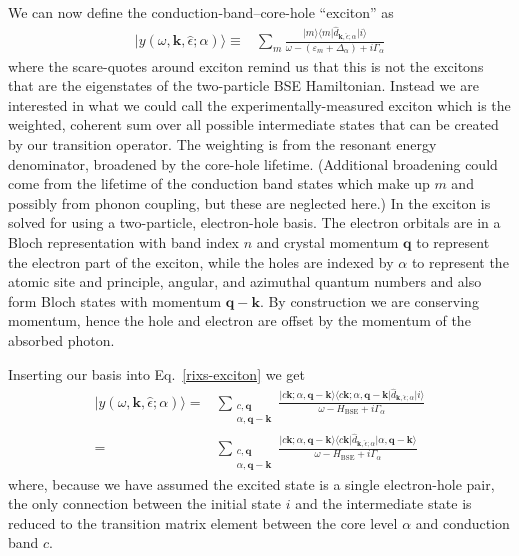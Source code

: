 \documentclass[11pt]{report}
\begin{document}
We can now define the conduction-band--core-hole ``exciton'' as
\begin{align}
\label{rixs-exciton}
\vert y(\omega,\mathbf{k}, \hat{\epsilon};\alpha) \rangle \equiv& \sum_m \frac{ \vert m \rangle \langle m \vert \hat{d}_{\mathbf{k}, \hat{\epsilon};\alpha} \vert i \rangle}{\omega - (\varepsilon_m +\Delta_\alpha) + i\Gamma_{\alpha}} 
\end{align}
where the scare-quotes around exciton remind us that this is not the excitons that are the eigenstates of the two-particle BSE Hamiltonian.
Instead we are interested in what we could call the experimentally-measured exciton which is the weighted, coherent sum over all possible intermediate states that can be created by our transition operator. 
The weighting is from the resonant energy denominator, broadened by the core-hole lifetime. 
(Additional broadening could come from the lifetime of the conduction band states which make up $m$ and possibly from phonon coupling, but these are neglected here.)
In  the exciton is solved for using a two-particle, electron-hole basis. The electron orbitals are in a Bloch representation with band index $n$ and crystal momentum $\mathbf{q}$ to represent the electron part of the exciton, while the holes are indexed by $\alpha$ to represent the atomic site and principle, angular, and azimuthal quantum numbers and also form Bloch states with momentum $\mathbf{q-k}$.
By construction we are conserving momentum, hence the hole and electron are offset by the momentum of the absorbed photon.

Inserting our basis into Eq.~\ref{rixs-exciton} we get
\begin{align}
\vert y(\omega,\mathbf{k}, \hat{\epsilon};\alpha) \rangle =& 
\sum_{\substack{c, \mathbf{q}\\ \alpha, \mathbf{q-k}}} \frac{ \vert c \mathbf{k}; \alpha, \mathbf{q-k}\rangle \langle  c \mathbf{k}; \alpha, \mathbf{q-k} \vert \hat{d}_{\mathbf{k}, \hat{\epsilon};\alpha} \vert i \rangle}{\omega - H_\textrm{BSE} + i\Gamma_{\alpha}} \nonumber \\
=&\sum_{\substack{c, \mathbf{q}\\ \alpha, \mathbf{q-k}}} \frac{ \vert c \mathbf{k}; \alpha, \mathbf{q-k}\rangle \langle  c \mathbf{k} \vert \hat{d}_{\mathbf{k}, \hat{\epsilon};\alpha} \vert  \alpha, \mathbf{q-k} \rangle}{\omega - H_\textrm{BSE} + i\Gamma_{\alpha}} 
\end{align}
where, because we have assumed the excited state is a single electron-hole pair, the only connection between the initial state $i$ and the intermediate state is reduced to the transition matrix element between the core level $\alpha$ and conduction band $c$.
\end{document}
